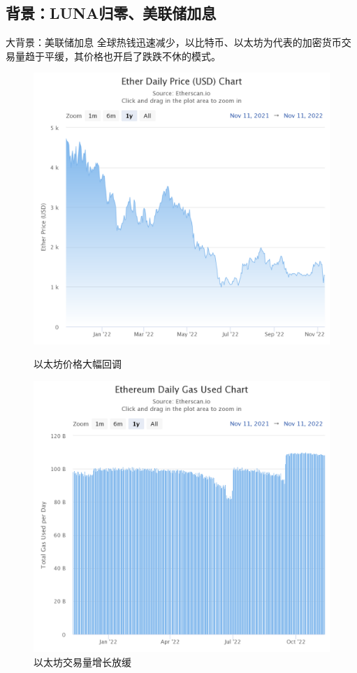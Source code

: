 \subsection{背景：LUNA归零、美联储加息}
\begin{frame}{大背景：美联储加息}
    全球热钱迅速减少，以比特币、以太坊为代表的加密货币交易量趋于平缓，其价格也开启了跌跌不休的模式。

\begin{figure}[H]
    \begin{minipage}[t]{0.48\linewidth}
        \includegraphics[width=\linewidth]{img/ether-daily-price-usd-ch.png}
        \caption{以太坊价格大幅回调}
    \end{minipage}
    \begin{minipage}[t]{0.48\linewidth}
        \includegraphics[width=\linewidth]{img/ethereum-daily-gas-used.png}
        \caption{以太坊交易量增长放缓}
    \end{minipage}
\end{figure}
\end{frame}

